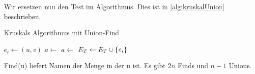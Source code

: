         Wir ersetzen nun den Test im Algorithmus. Dies ist in \autoref{alg:kruskalUnion} beschrieben.
    	\begin{algorithm}
        		\caption{Kruskals Algorithmus mit Union-Find}
        		\label{alg:kruskalUnion}
        		\begin{algorithmic}[1]
        				    \State $e_i \gets (u,v)$
        				    \State $a \gets $ 
        				    \State $a \gets $ 
        				        \State {}
        				        \State $E_T \gets E_T \cup \{e_i\}$
        				    \EndIf
        				\EndFor
        			\EndFunction
        		\end{algorithmic}
        	\end{algorithm}
        Find(u) liefert Namen der Menge in der u ist. Es gibt $2n$ Finds und $n-1$ Unions.
        
